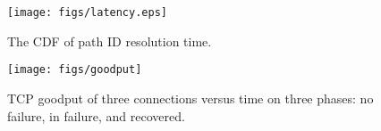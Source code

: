 



\begin{figure}[!t]
\centering
\texttt{[image: figs/latency.eps]}
\vspace{-0.1in}
\caption{The CDF of path ID resolution time.} \label{fig:eval.latency}
\vspace{-0.15in}
\end{figure}


\begin{figure}[t]
\centering
\texttt{[image: figs/goodput]}
\caption{TCP goodput of three connections versus time on three phases: no failure, in failure, and recovered.}
\label{fig:eval-tcpvstime}
\vspace{-0.25in}
\end{figure}



